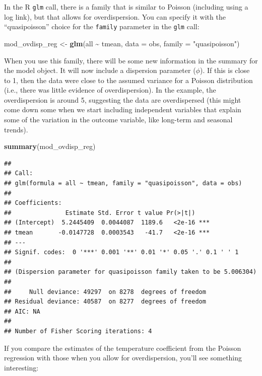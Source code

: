 \documentclass[
]{book}
\newenvironment{Shaded}{\begin{snugshade}}{\end{snugshade}}
\newcommand{\AttributeTok}[1]{\textcolor[rgb]{0.13,0.29,0.53}{#1}}
\newcommand{\FunctionTok}[1]{\textcolor[rgb]{0.13,0.29,0.53}{\textbf{#1}}}
\newcommand{\NormalTok}[1]{#1}
\newcommand{\OtherTok}[1]{\textcolor[rgb]{0.56,0.35,0.01}{#1}}
\newcommand{\SpecialCharTok}[1]{\textcolor[rgb]{0.81,0.36,0.00}{\textbf{#1}}}
\newcommand{\StringTok}[1]{\textcolor[rgb]{0.31,0.60,0.02}{#1}}
\begin{document}
In the R \texttt{glm} call, there is a family that is similar to Poisson (including
using a log link), but that allows for overdispersion. You can specify it
with the ``quasipoisson'' choice for the \texttt{family} parameter in the \texttt{glm} call:

\begin{Shaded}
\begin{Highlighting}[]
\NormalTok{mod\_ovdisp\_reg }\OtherTok{\textless{}{-}} \FunctionTok{glm}\NormalTok{(all }\SpecialCharTok{\textasciitilde{}}\NormalTok{ tmean, }\AttributeTok{data =}\NormalTok{ obs, }\AttributeTok{family =} \StringTok{"quasipoisson"}\NormalTok{)}
\end{Highlighting}
\end{Shaded}

When you use this family, there will be some new information in the summary
for the model object. It will now include a dispersion parameter (\(\phi\)). If this
is close to 1, then the data were close to the assumed variance for a Poisson
distribution (i.e., there was little evidence of overdispersion). In the
example, the overdispersion is around 5, suggesting the data are overdispersed
(this might come down some when we start including independent variables that
explain some of the variation in the outcome variable, like long-term and
seasonal trends).

\begin{Shaded}
\begin{Highlighting}[]
\FunctionTok{summary}\NormalTok{(mod\_ovdisp\_reg)}
\end{Highlighting}
\end{Shaded}

\begin{verbatim}
## 
## Call:
## glm(formula = all ~ tmean, family = "quasipoisson", data = obs)
## 
## Coefficients:
##               Estimate Std. Error t value Pr(>|t|)    
## (Intercept)  5.2445409  0.0044087  1189.6   <2e-16 ***
## tmean       -0.0147728  0.0003543   -41.7   <2e-16 ***
## ---
## Signif. codes:  0 '***' 0.001 '**' 0.01 '*' 0.05 '.' 0.1 ' ' 1
## 
## (Dispersion parameter for quasipoisson family taken to be 5.006304)
## 
##     Null deviance: 49297  on 8278  degrees of freedom
## Residual deviance: 40587  on 8277  degrees of freedom
## AIC: NA
## 
## Number of Fisher Scoring iterations: 4
\end{verbatim}

If you compare the estimates of the temperature coefficient from the Poisson
regression with those when you allow for overdispersion, you'll see something
interesting:
\end{document}

